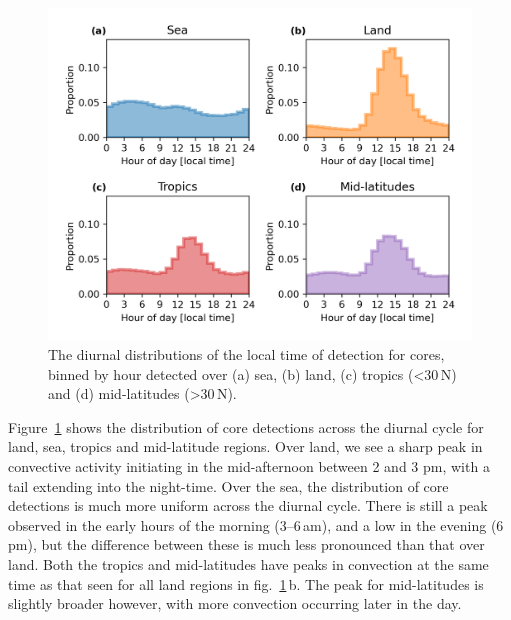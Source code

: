 

\begin{figure}[tp]
    \centering
    \includegraphics[width=\textwidth]{figures/chapter2_12.png}
    \caption[
    The diurnal distributions of the local time of detection for cores detected over land, sea, tropics and mid-latitudes
    ]{
    The diurnal distributions of the local time of detection for cores, binned by hour detected over (a) sea, (b) land, (c) tropics (\textless 30\,\textdegree N) and (d) mid-latitudes (\textgreater 30\,\textdegree N).
    }
    \label{fig:core_diurnal_land_sea}
\end{figure}


Figure~\ref{fig:core_diurnal_land_sea} shows the distribution of core detections across the diurnal cycle for land, sea, tropics and mid-latitude regions.
Over land, we see a sharp peak in convective activity initiating in the mid-afternoon between 2 and 3 pm, with a tail extending into the night-time.
Over the sea, the distribution of core detections is much more uniform across the diurnal cycle.
There is still a peak observed in the early hours of the morning (3--6\,am), and a low in the evening (6\,pm), but the difference between these is much less pronounced than that over land.
Both the tropics and mid-latitudes have peaks in convection at the same time as that seen for all land regions in fig.~\ref{fig:core_diurnal_land_sea}\,b.
The peak for mid-latitudes is slightly broader however, with more convection occurring later in the day.

